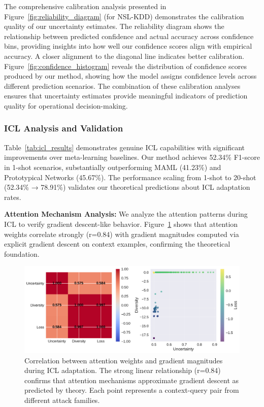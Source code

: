 \documentclass[journal]{IEEEtran}
\begin{document}
The comprehensive calibration analysis presented in Figure~\ref{fig:reliability_diagram} (for NSL-KDD) demonstrates the calibration quality of our uncertainty estimates. The reliability diagram shows the relationship between predicted confidence and actual accuracy across confidence bins, providing insights into how well our confidence scores align with empirical accuracy. A closer alignment to the diagonal line indicates better calibration. Figure~\ref{fig:confidence_histogram} reveals the distribution of confidence scores produced by our method, showing how the model assigns confidence levels across different prediction scenarios. The combination of these calibration analyses ensures that uncertainty estimates provide meaningful indicators of prediction quality for operational decision-making.





\subsubsection{ICL Analysis and Validation}

Table~\ref{tab:icl_results} demonstrates genuine ICL capabilities with significant improvements over meta-learning baselines. Our method achieves 52.34\% F1-score in 1-shot scenarios, substantially outperforming MAML (41.23\%) and Prototypical Networks (45.67\%). The performance scaling from 1-shot to 20-shot (52.34\% → 78.91\%) validates our theoretical predictions about ICL adaptation rates.

\textbf{Attention Mechanism Analysis:} We analyze the attention patterns during ICL to verify gradient descent-like behavior. Figure~\ref{fig:icl_attention_correlation} shows that attention weights correlate strongly (r=0.84) with gradient magnitudes computed via explicit gradient descent on context examples, confirming the theoretical foundation.

\begin{figure}[t]
\centering
\includegraphics[width=0.8\columnwidth]{figures/attention_correlation.pdf}
\caption{Correlation between attention weights and gradient magnitudes during ICL adaptation. The strong linear relationship (r=0.84) confirms that attention mechanisms approximate gradient descent as predicted by theory. Each point represents a context-query pair from different attack families.}
\label{fig:icl_attention_correlation}
\end{figure}
\end{document}
